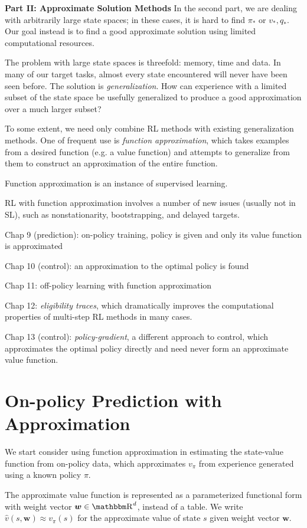 \documentclass[sutton_barto_notes.tex]{subfiles}
\begin{document}
\newpage
\textbf{Part II: Approximate Solution Methods}
In the second part, we are dealing with arbitrarily large state spaces; in these cases, it is hard to find $\pi_*$ or $v_*, q_*$.
Our goal instead is to find a good approximate solution using limited computational resources.

The problem with large state spaces is threefold: memory, time and data.
In many of our target tasks, almost every state encountered will never have been seen before. The solution is \textit{generalization}.
How can experience with a limited subset of the state space be usefully generalized to produce a good approximation over a much larger subset?

To some extent, we need only combine RL methods with existing  generalization methods. One of frequent use is \textit{function approximation}, which takes examples from a desired function (e.g. a value function) and attempts to generalize from them to construct an approximation of the entire function.

Function approximation is an instance of supervised learning.

RL with function approximation involves a number of new issues (usually not in SL), such as nonstationarity, bootstrapping, and delayed targets.

Chap 9 (prediction): on-policy training, policy is given and only its value function is approximated

Chap 10 (control): an approximation to the optimal policy is found

Chap 11: off-policy learning with function approximation

Chap 12: \textit{eligibility traces}, which dramatically improves the computational properties of multi-step RL methods in many cases.

Chap 13 (control): \textit{policy-gradient}, a different approach to control, which approximates the optimal policy directly and need never form an approximate value function.

\newpage
\section{On-policy Prediction with Approximation}

We start consider using function approximation in estimating the state-value function from on-policy data, which approximates $v_\pi$ from experience generated using a known policy $\pi$.

The approximate value function is represented as a parameterized functional form with weight vector $\bm{w} \in \R^d$, instead of a table.
We write $\hat{v}(s,\bm{w}) \approx v_\pi(s)$ for the approximate value of state $s$ given weight vector $\bm{w}$.
\end{document}
